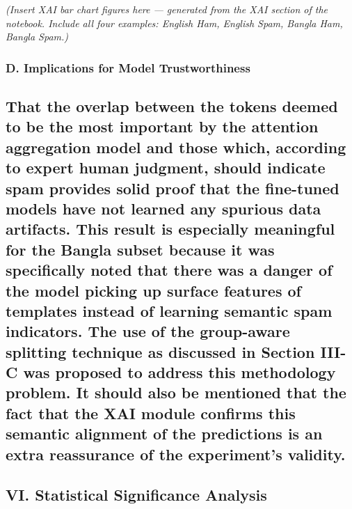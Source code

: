 \emph{(Insert XAI bar chart figures here --- generated from the XAI
section of the notebook. Include all four examples: English Ham, English
Spam, Bangla Ham, Bangla Spam.)}

\subsubsection{D. Implications for Model
Trustworthiness}\label{d.-implications-for-model-trustworthiness}

\subsection{That the overlap between the tokens deemed to be the most
important by the attention aggregation model and those which, according
to expert human judgment, should indicate spam provides solid proof that
the fine-tuned models have not learned any spurious data artifacts. This
result is especially meaningful for the Bangla subset because it was
specifically noted that there was a danger of the model picking up
surface features of templates instead of learning semantic spam
indicators. The use of the group-aware splitting technique as discussed
in Section III-C was proposed to address this methodology problem. It
should also be mentioned that the fact that the XAI module confirms this
semantic alignment of the predictions is an extra reassurance of the
experiment's
validity.}\label{that-the-overlap-between-the-tokens-deemed-to-be-the-most-important-by-the-attention-aggregation-model-and-those-which-according-to-expert-human-judgment-should-indicate-spam-provides-solid-proof-that-the-fine-tuned-models-have-not-learned-any-spurious-data-artifacts.-this-result-is-especially-meaningful-for-the-bangla-subset-because-it-was-specifically-noted-that-there-was-a-danger-of-the-model-picking-up-surface-features-of-templates-instead-of-learning-semantic-spam-indicators.-the-use-of-the-group-aware-splitting-technique-as-discussed-in-section-iii-c-was-proposed-to-address-this-methodology-problem.-it-should-also-be-mentioned-that-the-fact-that-the-xai-module-confirms-this-semantic-alignment-of-the-predictions-is-an-extra-reassurance-of-the-experiments-validity.}

\subsection{VI. Statistical Significance
Analysis}\label{vi.-statistical-significance-analysis}

